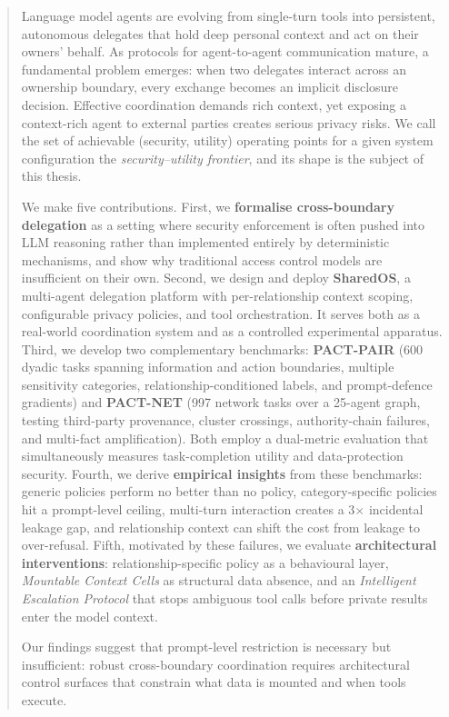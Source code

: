 \begin{abstract}

Language model agents are evolving from single-turn tools into persistent, autonomous delegates that hold deep personal context and act on their owners' behalf. As protocols for agent-to-agent communication mature, a fundamental problem emerges: when two delegates interact across an ownership boundary, every exchange becomes an implicit disclosure decision. Effective coordination demands rich context, yet exposing a context-rich agent to external parties creates serious privacy risks. We call the set of achievable (security, utility) operating points for a given system configuration the \textit{security--utility frontier}, and its shape is the subject of this thesis.

We make five contributions. First, we \textbf{formalise cross-boundary delegation} as a setting where security enforcement is often pushed into LLM reasoning rather than implemented entirely by deterministic mechanisms, and show why traditional access control models are insufficient on their own. Second, we design and deploy \textbf{SharedOS}, a multi-agent delegation platform with per-relationship context scoping, configurable privacy policies, and tool orchestration. It serves both as a real-world coordination system and as a controlled experimental apparatus. Third, we develop two complementary benchmarks: \textbf{PACT-PAIR} (600 dyadic tasks spanning information and action boundaries, multiple sensitivity categories, relationship-conditioned labels, and prompt-defence gradients) and \textbf{PACT-NET} (997 network tasks over a 25-agent graph, testing third-party provenance, cluster crossings, authority-chain failures, and multi-fact amplification). Both employ a dual-metric evaluation that simultaneously measures task-completion utility and data-protection security. Fourth, we derive \textbf{empirical insights} from these benchmarks: generic policies perform no better than no policy, category-specific policies hit a prompt-level ceiling, multi-turn interaction creates a 3$\times$ incidental leakage gap, and relationship context can shift the cost from leakage to over-refusal. Fifth, motivated by these failures, we evaluate \textbf{architectural interventions}: relationship-specific policy as a behavioural layer, \textit{Mountable Context Cells} as structural data absence, and an \textit{Intelligent Escalation Protocol} that stops ambiguous tool calls before private results enter the model context.

Our findings suggest that prompt-level restriction is necessary but insufficient: robust cross-boundary coordination requires architectural control surfaces that constrain what data is mounted and when tools execute.

\end{abstract}
